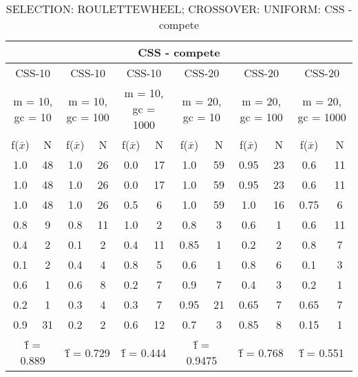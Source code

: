 \begin{table}[H]
	\centering
	\caption{SELECTION: ROULETTEWHEEL; CROSSOVER: UNIFORM: CSS - compete}
	\begin{adjustbox}{width=1\textwidth}
		\begin{tabular}{ |c|c||c|c||c|c||c|c||c|c||c|c| }
			\hline
			\multicolumn{12}{|c|}{CSS - compete} \\
			\hline
			\multicolumn{2}{|c||}{CSS-10} & \multicolumn{2}{c||}{CSS-10} & \multicolumn{2}{c||}{CSS-10} & \multicolumn{2}{c||}{CSS-20} & \multicolumn{2}{c||}{CSS-20} & \multicolumn{2}{c|}{CSS-20}\\
			\hline
			\multicolumn{2}{|c||}{m = 10, gc = 10} & \multicolumn{2}{c||}{m = 10, gc = 100} & \multicolumn{2}{c||}{m = 10, gc = 1000} & \multicolumn{2}{c||}{m = 20, gc = 10} & \multicolumn{2}{c||}{m = 20, gc = 100} & \multicolumn{2}{c|}{m = 20, gc = 1000}\\
			\hline
			f($\bar{x}$) & N & f($\bar{x}$) & N & f($\bar{x}$) & N & f($\bar{x}$) & N & f($\bar{x}$) & N & f($\bar{x}$) & N\\
			\hline
			\hline
			1.0 & 48 & 1.0 & 26 & 0.0 & 17 & 1.0 & 59 & 0.95 & 23 & 0.6 & 11\\
			\hline
			1.0 & 48 & 1.0 & 26 & 0.0 & 17 & 1.0 & 59 & 0.95 & 23 & 0.6 & 11\\
			1.0 & 48 & 1.0 & 26 & 0.5 & 6 & 1.0 & 59 & 1.0 & 16 & 0.75 & 6\\
			0.8 & 9 & 0.8 & 11 & 1.0 & 2 & 0.8 & 3 & 0.6 & 1 & 0.6 & 11\\
			0.4 & 2 & 0.1 & 2 & 0.4 & 11 & 0.85 & 1 & 0.2 & 2 & 0.8 & 7\\
			0.1 & 2 & 0.4 & 4 & 0.8 & 5 & 0.6 & 1 & 0.8 & 6 & 0.1 & 3\\
			0.6 & 1 & 0.6 & 8 & 0.2 & 7 & 0.9 & 7 & 0.4 & 3 & 0.2 & 1\\
			0.2 & 1 & 0.3 & 4 & 0.3 & 7 & 0.95 & 21 & 0.65 & 7 & 0.65 & 7\\
			0.9 & 31 & 0.2 & 2 & 0.6 & 12 & 0.7 & 3 & 0.85 & 8 & 0.15 & 1\\
			\hline
			\multicolumn{2}{|c||}{\^{f} = 0.889} & \multicolumn{2}{c||}{\^{f} = 0.729} & \multicolumn{2}{c||}{\^{f} = 0.444} & \multicolumn{2}{c||}{\^{f} = 0.9475} & \multicolumn{2}{c||}{\^{f} = 0.768} & \multicolumn{2}{c|}{\^{f} = 0.551}\\
			\hline
		\end{tabular}
	\end{adjustbox}
\end{table}

